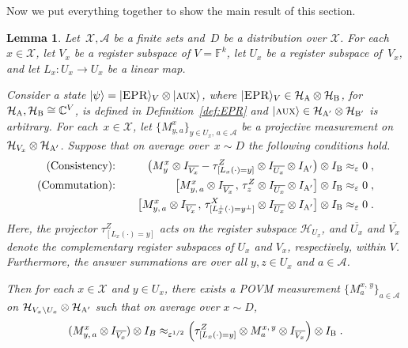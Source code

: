\documentclass[11pt]{article}
\newtheorem{lemma}[theorem]{Lemma}
\theoremstyle{definition}
\newcommand{\ket}[1]{|#1\rangle}
\newcommand{\Id}{\ensuremath{I}}
\newcommand{\C}{\ensuremath{\mathbb{C}}}
\newcommand{\F}{\ensuremath{\mathbb{F}}}
\newcommand{\mH}{\ensuremath{\mathcal{H}}}
\newcommand{\eps}{\varepsilon}
\newcommand{\labelstyle}[1]{\ensuremath{\textsc{#1}}\xspace}
\newcommand{\EPR}{\labelstyle{EPR}}
\newcommand{\aux}{\labelstyle{aux}}
\newcommand{\alice}{\labelstyle{A}}
\newcommand{\bob}{\labelstyle{B}}
\renewcommand{\cal}[1]{\mathcal{#1}}
\begin{document}
Now we put everything together to show the main result of this section. 

\begin{lemma}
  \label{lem:mixing}
  Let~$\cal{X},\cal{A}$ be a finite sets and~$D$ be a distribution over
  $\cal{X}$.
  For each~$x \in \cal{X}$, let $V_x$ be a register subspace of $V = \F^k$, let
  $U_x$ be a register subspace of~$V_x$, and let $L_x:U_x \to U_x$ be a linear
  map.

  Consider a state $\ket{\psi} = \ket{\EPR}_V \otimes \ket{\aux}$, where
  $\ket{\EPR}_{V} \in \mH_\alice \otimes \mH_\bob$, for $\mH_\alice,\mH_\bob
  \cong \C^{V}$, is defined in Definition~\ref{def:EPR} and $\ket{\aux}\in
  \mH_{\alice'} \otimes \mH_{\bob'}$ is arbitrary.
  For each~$x \in \cal{X}$, let $\{M^{x}_{y,a}\}_{y \in U_x,\, a\in \cal{A}}$ be
  a projective measurement on $\mH_{V_x} \otimes \mH_{\alice'}$.
  Suppose that on average over~$x \sim D$ the following conditions hold.
  \begin{alignat*}{2}
    \text{(Consistency):} && \quad
    \bigl( M^{x}_{y} \otimes \Id_{\overline{V_x}} - \tau^Z_{[L_x(\cdot) = y]}
    \otimes \Id_{\overline{U_x}} \otimes \Id_{\alice'}\bigr) \otimes \Id_\bob
    \approx_\eps 0\;, &\\
    \text{(Commutation):} && \quad
      \bigl[ M^{x}_{y,\, a} \otimes \Id_{\overline{V_x}}\,,\, \tau^Z_{z} \otimes
      \Id_{\overline{U_x}}   \otimes \Id_{\alice'} \bigr] \otimes
      \Id_\bob\approx_\eps 0\;, &\\
      && \quad
      \bigl[ M^{x}_{y,\, a}\otimes \Id_{\overline{V_x}}\,,\,
      \tau^X_{[L_x^\perp(\cdot) = y^\perp]}  \otimes \Id_{\overline{U_x}}
      \otimes \Id_{\alice'} \bigr]  \otimes \Id_\bob  \approx_\eps 0\;.&
  \end{alignat*}
  Here, the projector $\tau^Z_{[L_x(\cdot) = y]}$ acts on the register subspace
  $\mH_{U_x}$, and $\overline{U_x}$ and $\overline{V_x}$ denote the
  complementary register subspaces of $U_x$ and $V_x$, respectively, within $V$. Furthermore, the answer summations are over all $y, z \in U_x$ and $a \in \cal{A}$.
  
  
  Then for each $x\in \cal{X}$ and $y \in U_x$, there exists a POVM measurement
  $\bigl\{ M^{x,\, y}_a \bigr\}_{a \in \cal{A}} $ on $\mH_{V_x \setminus
    U_x}\otimes \mH_{\alice'}$ such that on average over $x \sim D$,
  \begin{equation*}
    (M^{x}_{y,\, a} \otimes \Id_{\overline{V_x}}) \otimes \Id_{B}
    \approx_{\eps^{1/2}} \Bigl(\tau^Z_{[L_x(\cdot) = y]} \otimes M^{x,\, y}_a
    \otimes \Id_{\overline{V_x}}\Bigr) \otimes \Id_\bob\;.
  \end{equation*}
\end{lemma}
\end{document}
